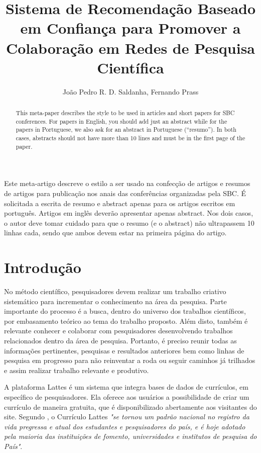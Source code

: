 \documentclass[12pt]{article}
\title{Sistema de Recomendação Baseado em Confiança para Promover a Colaboração em Redes de Pesquisa Científica}
\author{João Pedro R. D. Saldanha\inst{1}, Fernando Prass\inst{1}}
\begin{document}
 

\maketitle

\begin{abstract}
  This meta-paper describes the style to be used in articles and short papers
  for SBC conferences. For papers in English, you should add just an abstract
  while for the papers in Portuguese, we also ask for an abstract in
  Portuguese (``resumo''). In both cases, abstracts should not have more than
  10 lines and must be in the first page of the paper.
\end{abstract}
     
\begin{resumo} 
  Este meta-artigo descreve o estilo a ser usado na confecção de artigos e
  resumos de artigos para publicação nos anais das conferências organizadas
  pela SBC. É solicitada a escrita de resumo e abstract apenas para os artigos
  escritos em português. Artigos em inglês deverão apresentar apenas abstract.
  Nos dois casos, o autor deve tomar cuidado para que o resumo (e o abstract)
  não ultrapassem 10 linhas cada, sendo que ambos devem estar na primeira
  página do artigo.
\end{resumo}


\section{Introdução}

No método científico, pesquisadores devem realizar um trabalho criativo sistemático para incrementar 
o conhecimento na área da pesquisa. Parte importante do processo é a busca, dentro do universo dos 
trabalhos científicos, por embasamento teórico ao tema do trabalho proposto. Além disto, também é 
relevante conhecer e colaborar com pesquisadores desenvolvendo trabalhos relacionados dentro da 
área de pesquisa.  Portanto, é preciso reunir todas as informações pertinentes, pesquisas e resultados 
anteriores bem como linhas de pesquisa em progresso para não reinventar a roda ou seguir caminhos já 
trilhados e assim realizar trabalho relevante e produtivo.

A plataforma Lattes é um sistema que integra bases de dados de currículos, em específico de pesquisadores. 
Ela oferece aos usuários a possibilidade de criar um currículo de maneira gratuita, que é disponibilizado 
abertamente aos visitantes do site. Segundo \cite{CNPq2019lattes}, o Currículo Lattes 
\textit{"se tornou um padrão nacional no registro da vida pregressa e atual dos estudantes e 
pesquisadores do país, e é hoje adotado pela maioria das instituições de fomento, universidades e 
institutos de pesquisa do País"}.
    
\end{document}
